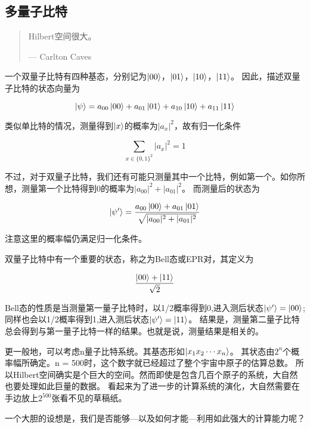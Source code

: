 \subsection{多量子比特}

\begin{quote}
Hilbert空间很大。

--- Carlton Caves
\end{quote}

一个双量子比特有四种基态，分别记为$\ket{00}$，$\ket{01}$，$\ket{10}$，$\ket{11}$。
因此，描述双量子比特的状态向量为

\begin{equation}
\ket{\psi} = a_{00}\ket{00} + a_{01}\ket{01} + a_{10}\ket{10} + a_{11}\ket{11}
\end{equation}

类似单比特的情况，测量得到$\ket{x}$的概率为$|a_x|^2$，故有归一化条件

\begin{equation}
\sum_{x\in\{0,1\}^2}|a_x|^2 = 1
\end{equation}

不过，对于双量子比特，我们还有可能只测量其中一个比特，例如第一个。如你所想，测量第一个比特得到0的概率为$|a_{00}|^2 + |a_{01}|^2$。
而测量后的状态为

\begin{equation}
\ket{\psi'} = \frac{a_{00}\ket{00} + a_{01}\ket{01}}{\sqrt{|a_{00}|^2 + |a_{01}|^2}}
\end{equation}

注意这里的概率幅仍满足归一化条件。

双量子比特中有一个重要的状态，称之为Bell态或EPR对，其定义为

\begin{equation}
\frac{\ket{00} + \ket{11}}{\sqrt{2}}
\end{equation}

Bell态的性质是当测量第一量子比特时，以1/2概率得到0,进入测后状态$\ket{\psi'} = \ket{00}$;
同样也会以1/2概率得到1,进入测后状态$\ket{\psi'} = \ket{11}$。
结果是，测量第二量子比特总会得到与第一量子比特一样的结果。也就是说，测量结果是相关的。

更一般地，可以考虑n量子比特系统。其基态形如$\ket{x_1x_2\cdots x_n}$。
其状态由$2^n$个概率幅所确定。n = 500时，这个数字就已经超过了整个宇宙中原子的估算总数。
所以Hilbert空间确实是个巨大的空间。然而即使是包含几百个原子的系统，大自然也要处理如此巨量的数据。
看起来为了进一步的计算系统的演化，大自然需要在手边放上$2^{500}$张看不见的草稿纸。

一个大胆的设想是，我们是否能够---以及如何才能---利用如此强大的计算能力呢？

